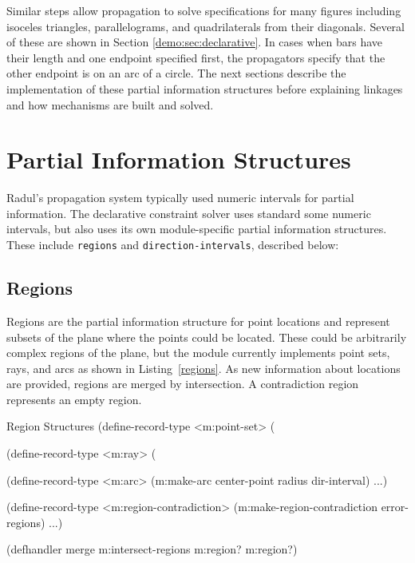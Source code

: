 Similar steps allow propagation to solve specifications for many
figures including isoceles triangles, parallelograms, and
quadrilaterals from their diagonals. Several of these are shown in
Section \ref{demo:sec:declarative}. In cases when bars have their
length and one endpoint specified first, the propagators specify that
the other endpoint is on an arc of a circle. The next sections
describe the implementation of these partial information structures
before explaining linkages and how mechanisms are built and solved.

\newpage
\section{Partial Information Structures}

Radul's propagation system typically used numeric intervals for
partial information. The declarative constraint solver uses standard
some numeric intervals, but also uses its own module-specific partial
information structures. These include \texttt{regions} and
\texttt{direction-intervals}, described below:

\subsection{Regions}

Regions are the partial information structure for point locations and
represent subsets of the plane where the points could be
located. These could be arbitrarily complex regions of the plane, but
the module currently implements point sets, rays, and arcs as shown in
Listing~\ref{regions}. As new information about locations are
provided, regions are merged by intersection. A contradiction region
represents an empty region.

\enlargethispage*{\baselineskip}
\begin{code-listing}
[label=regions]
{Region Structures}
(define-record-type <m:point-set>
  (%

(define-record-type <m:ray>
  (%

(define-record-type <m:arc>
  (m:make-arc center-point radius dir-interval) ...)

(define-record-type <m:region-contradiction>
  (m:make-region-contradiction error-regions) ...)

(defhandler merge m:intersect-regions m:region? m:region?)
\end{code-listing}

